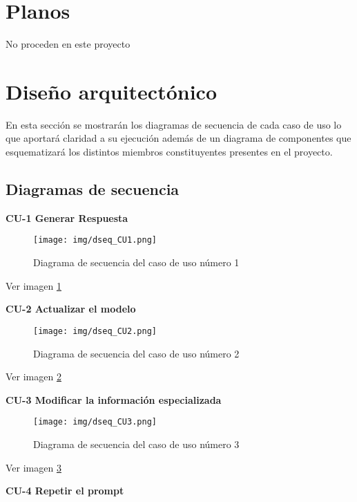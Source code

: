 


\section{Planos}

No proceden en este proyecto

\section{Diseño arquitectónico}

En esta sección se mostrarán los diagramas de secuencia de cada caso de uso lo que aportará claridad a su ejecución además de un diagrama de componentes que esquematizará los distintos miembros constituyentes presentes en el proyecto.

\subsection{Diagramas de secuencia}

\textbf{CU-1 Generar Respuesta}

\begin{figure}[h]
    \centering
    \texttt{[image: img/dseq\_CU1.png]}
    \caption{Diagrama de secuencia del caso de uso número 1}
    \label{fig:dseq1}
\end{figure}

Ver imagen \ref{fig:dseq1}

\textbf{CU-2 Actualizar el modelo}

\begin{figure}[h]
    \centering
    \texttt{[image: img/dseq\_CU2.png]}
    \caption{Diagrama de secuencia del caso de uso número 2}
    \label{fig:dseq2}
\end{figure}

Ver imagen \ref{fig:dseq2}

\textbf{CU-3 Modificar la información especializada}

\begin{figure}[h]
    \centering
    \texttt{[image: img/dseq\_CU3.png]}
    \caption{Diagrama de secuencia del caso de uso número 3}
    \label{fig:dseq3}
\end{figure}

Ver imagen \ref{fig:dseq3}

\textbf{CU-4 Repetir el prompt}

